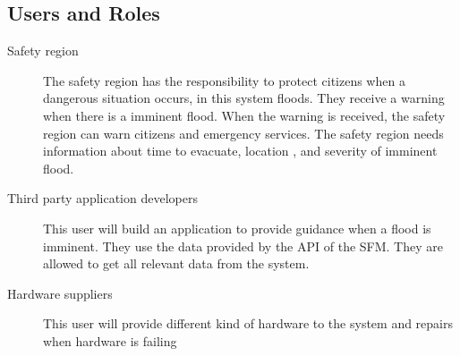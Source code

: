 \subsection{Users and Roles}
\begin{description}
	\item[Safety region] The safety region has the responsibility to protect citizens when a dangerous situation occurs, in this system floods. They receive a warning when there is a imminent flood. When the warning is received, the safety region can warn citizens and emergency services. The safety region needs information about time to evacuate, location , and severity of imminent flood.
	\item[Third party application developers] This user will build an application to provide guidance when a flood is imminent. They use the data provided by the API of the SFM. They are allowed to get all relevant data from the system.
	\item[Hardware suppliers] This user will provide different kind of hardware to the system and repairs when hardware is failing
\end{description} 

